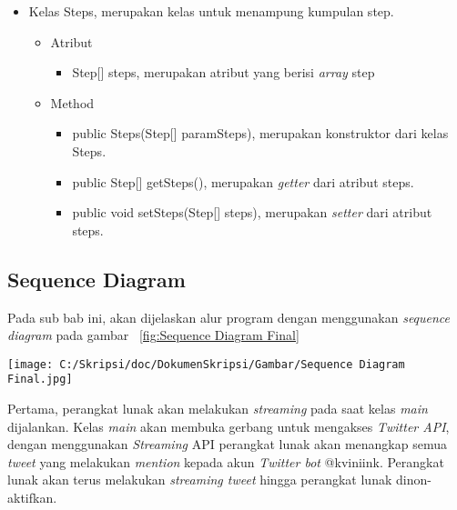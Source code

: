 \begin{itemize}
		\item Kelas Steps, merupakan kelas untuk menampung kumpulan step.
		
		
				\begin{itemize}
							\item Atribut
					
					
									\begin{itemize}
												\item Step[] steps, merupakan atribut yang berisi \textit{array} step
									\end{itemize}
					
							\item Method
					
					
									\begin{itemize}
												\item public Steps(Step[] paramSteps), merupakan konstruktor dari kelas Steps.
												\item public Step[] getSteps(), merupakan \textit{getter} dari atribut steps.
												\item public void setSteps(Step[] steps), merupakan \textit{setter} dari atribut steps.
									\end{itemize}
				\end{itemize}
\end{itemize}


\subsection{Sequence Diagram}
Pada sub bab ini, akan dijelaskan alur program dengan menggunakan \textit{sequence diagram} pada gambar ~\ref{fig:Sequence Diagram Final}

\begin{sidewaysfigure}[htbp]
	\centering
		\texttt{[image: C:/Skripsi/doc/DokumenSkripsi/Gambar/Sequence Diagram Final.jpg]}
	\caption{Sequence Diagram \textit{Twitter bot} untuk Mencari Jalur Transportasi Publik}
	\label{fig:Sequence Diagram Final}
\end{sidewaysfigure}


Pertama, perangkat lunak akan melakukan \textit{streaming} pada saat kelas \textit{main} dijalankan. Kelas \textit{main} akan membuka gerbang untuk mengakses \textit{Twitter API}, dengan menggunakan \textit{Streaming} API perangkat lunak akan menangkap semua \textit{tweet} yang melakukan \textit{mention} kepada akun \textit{Twitter bot} @kviniink. Perangkat lunak akan terus melakukan \textit{streaming tweet} hingga perangkat lunak dinon-aktifkan.

